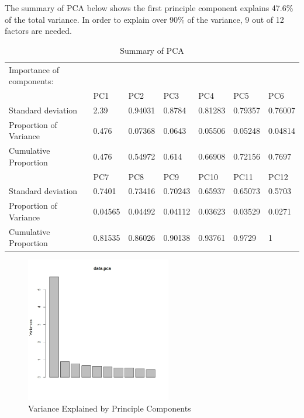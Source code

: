 \documentclass[conference]{IEEEtran}
\begin{document}
The summary of PCA below shows the first principle component explains 47.6\% of the total variance. In order to explain over 90\% of the variance, 9 out of 12 factors are needed. 

\begin{table}[!h]
\centering
\caption{Summary of PCA}
\label{pca}
\resizebox{9cm}{!} {
\begin{tabular}{lllllll}
Importance of components: &         &         &         &         &         &         \\
                          & PC1     & PC2     & PC3     & PC4     & PC5     & PC6     \\
Standard deviation        & 2.39    & 0.94031 & 0.8784  & 0.81283 & 0.79357 & 0.76007 \\
Proportion of Variance    & 0.476   & 0.07368 & 0.0643  & 0.05506 & 0.05248 & 0.04814 \\
Cumulative Proportion     & 0.476   & 0.54972 & 0.614   & 0.66908 & 0.72156 & 0.7697  \\
                          & PC7     & PC8     & PC9     & PC10    & PC11    & PC12    \\
Standard deviation        & 0.7401  & 0.73416 & 0.70243 & 0.65937 & 0.65073 & 0.5703  \\
Proportion of Variance    & 0.04565 & 0.04492 & 0.04112 & 0.03623 & 0.03529 & 0.0271  \\
Cumulative Proportion     & 0.81535 & 0.86026 & 0.90138 & 0.93761 & 0.9729  & 1      
\end{tabular}
}
\end{table}

\begin{figure}[!h]
\centering
\includegraphics[width=2.5in]{fig1.jpeg}
\caption{Variance Explained by Principle Components}
\label{fig1}
\end{figure}
\end{document}
